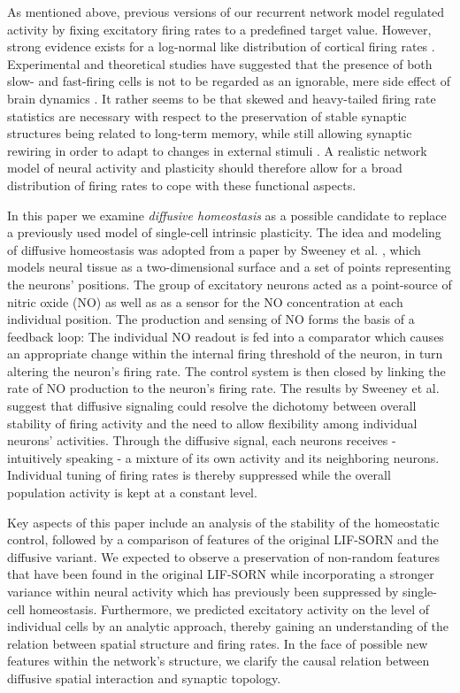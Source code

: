 \documentclass[10pt,letterpaper]{article}
\begin{document}
As mentioned above, previous versions of our recurrent network model regulated activity by fixing excitatory firing rates to a predefined target value. However, strong evidence exists for a log-normal like distribution of cortical firing rates \cite{Buzsaki_Fir_Rates_2014,Wohrer_Fir_Rates_2012}. Experimental and theoretical studies have suggested that the presence of both slow- and fast-firing cells is not to be regarded as an ignorable, mere side effect of brain dynamics \cite{Buzsaki_2004,Marsat_2010,Tripathy_2013}. It rather seems to be that skewed and heavy-tailed firing rate statistics are necessary with respect to the preservation of stable synaptic structures being related to long-term memory, while still allowing synaptic rewiring in order to adapt to changes in external stimuli \cite{Buzsaki_Fir_Rates_2014}. A realistic network model of neural activity and plasticity should therefore allow for a broad distribution of firing rates to cope with these functional aspects.

In this paper we examine \textit{diffusive homeostasis} as a possible candidate to replace a previously used model of single-cell intrinsic plasticity. The idea and modeling of diffusive homeostasis was adopted from a paper by Sweeney et al. \cite{Sweeney_Paper}, which models neural tissue as a two-dimensional surface and a set of points representing the neurons' positions. The group of excitatory neurons acted as a point-source of nitric oxide (NO) as well as as a sensor for the NO concentration at each individual position. The production and sensing of NO forms the basis of a feedback loop: The individual NO readout is fed into a comparator which causes an appropriate change within the internal firing threshold of the neuron, in turn altering the neuron's firing rate. The control system is then closed by linking the rate of NO production to the neuron's firing rate. The results by Sweeney et al. suggest that diffusive signaling could resolve the dichotomy between overall stability of firing activity and the need to allow flexibility among individual neurons' activities. Through the diffusive signal, each neurons receives - intuitively speaking - a mixture of its own activity and its neighboring neurons. Individual tuning of firing rates is thereby suppressed while the overall population activity is kept at a constant level.

Key aspects of this paper include an analysis of the stability of the homeostatic control, followed by a comparison of features of the original LIF-SORN and the diffusive variant. We expected to observe a preservation of non-random features that have been found in the original LIF-SORN while incorporating a stronger variance within neural activity which has previously been suppressed by single-cell homeostasis. Furthermore, we predicted excitatory activity on the level of individual cells by an analytic approach, thereby gaining an understanding of the relation between spatial structure and firing rates. In the face of possible new features within the network's structure, we clarify the causal relation between diffusive spatial interaction and synaptic topology.
\end{document}
